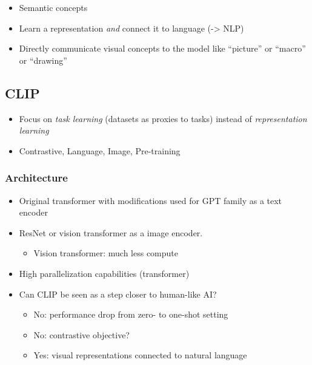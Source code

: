 \documentclass[
]{krantz}
\providecommand{\tightlist}{%
  \setlength{\itemsep}{0pt}\setlength{\parskip}{0pt}}
\begin{document}
\begin{itemize}
\tightlist
\item
  Semantic concepts
\item
  Learn a representation \emph{and} connect it to language (-\textgreater{} NLP)
\item
  Directly communicate visual concepts to the model like ``picture'' or ``macro'' or ``drawing''
\end{itemize}

\hypertarget{clip}{%
\subsection{CLIP}\label{clip}}

\begin{itemize}
\tightlist
\item
  Focus on \emph{task learning} (datasets as proxies to tasks) instead of \emph{representation learning}
\item
  Contrastive, Language, Image, Pre-training
\end{itemize}

\hypertarget{architecture}{%
\subsubsection{Architecture}\label{architecture}}

\begin{itemize}
\tightlist
\item
  Original transformer with modifications used for GPT family as a text encoder
\item
  ResNet or vision transformer as a image encoder.

  \begin{itemize}
  \tightlist
  \item
    Vision transformer: much less compute
  \end{itemize}
\item
  High parallelization capabilities (transformer)
\item
  Can CLIP be seen as a step closer to human-like AI?

  \begin{itemize}
  \tightlist
  \item
    No: performance drop from zero- to one-shot setting
  \item
    No: contrastive objective?
  \item
    Yes: visual representations connected to natural language
  \end{itemize}
\end{itemize}
\end{document}
